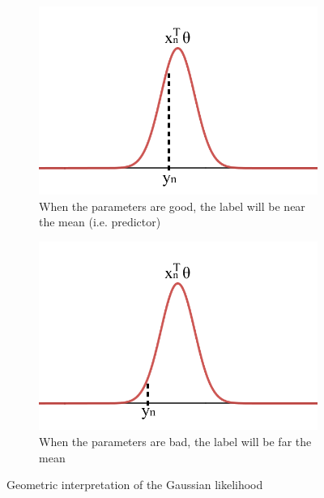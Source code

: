 \begin{description}
        \begin{figure}[ht]
            \begin{subfigure}{.45\textwidth}
                \centering
                \includegraphics[width=.75\linewidth]{img/gaussian_mle_good.png}
                \caption{When the parameters are good, the label will be near the mean (i.e. predictor)}
            \end{subfigure}
            \hspace*{1em}
            \begin{subfigure}{.45\textwidth}
                \centering
                \includegraphics[width=.75\linewidth]{img/gaussian_mle_bad.png}
                \caption{When the parameters are bad, the label will be far the mean}
            \end{subfigure}

            \caption{Geometric interpretation of the Gaussian likelihood}
        \end{figure}
\end{description}


